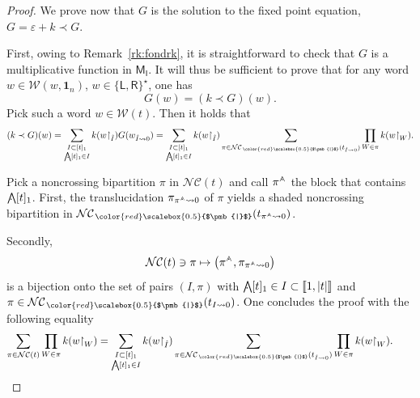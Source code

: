 \documentclass[pdftex]{sigma}
\renewcommand{\restriction}[2]{{#1\mathbin{\upharpoonright}_{#2}}}
\newcommand{\translucidation}[2]{{{#1}_{#2\leadsto0}}}
\newcommand{\bigwedgedot}{{\mathop{\bigwedge\hspace{-7.8pt}\raisebox{-1pt}[0pt][0pt]{$\cdot$}\hspace{3pt}}\nolimits}}
\newcommand{\bigwedgedots}{{\mathop{\bigwedge\hspace{-6.5pt}\raisebox{-1.5pt}[0pt][0pt]{$\cdot$}\hspace{2pt}}\nolimits}}
\newcommand{\wedgedot}{{\mathop{\wedge\hspace{-4.2pt}\raisebox{-1pt}[0pt][0pt]{$\cdot$}\hspace{2pt}}\nolimits}}
\newcommand{\wedgedots}{{\mathop{\wedge\hspace{-4pt}\raisebox{-1.5pt}[0pt][0pt]{$\cdot$}\hspace{1pt}}\nolimits}}
\newcommand\IWc{\mathcal{W}}
\newcommand{\BNCc}{\mathcal{N}\mathcal{C}}
\def\shBNCc{\BNCc_{\,{\color{red}\scalebox{0.5}{$\pmb{|}$}}}}
\newcommand\LL{{\mathsf{L}}}
\newcommand\RR{{\mathsf{R}}}
\newcommand\shgrI{{\mathsf M}_{\mathsf I}}
\numberwithin{equation}{section}
\begin{document}
\begin{proof}
We prove now that $G$ is the solution to the fixed point equation, $G = \varepsilon + k \prec G$.

First, owing to Remark~\ref{rk:fondrk}, it is straightforward to check that $G$ is a multiplicative function in $\shgrI$. It will thus be sufficient to prove that for any word $w\in \IWc(w,\mathbf{1}_n)$, $w\in \{\LL,\RR\}^{\star}$, one has
	\begin{equation*}
		G(w) = (k\prec G)(w).
	\end{equation*}
	Pick such a word $w \in \IWc(t)$. Then it holds that
	\begin{equation*}
 (k\prec G)(w) = \sum_{\substack{I \subset [t]_1 \\ \bigwedgedots [t]_1 \in I}} k(\restriction{w}{\hat{I}})G(\translucidation{w}{\hat{I}}) = \sum_{\substack{I \subset [t]_1 \\ \bigwedgedots [t]_1 \in I}} k(\restriction{w}{\hat{I}}) \sum_{\pi \in \shBNCc(\translucidation{t}{\hat{I}})} \prod_{W\in \pi} k(\restriction{w}{W}).
	\end{equation*}

Pick a noncrossing bipartition $\pi$ in $\BNCc(t)$ and call $\pi^{\wedgedot}$ the block that contains $\bigwedgedot[t]_1$. First, the translucidation $\translucidation{\pi}{\pi^{\wedgedots}}$ of $\pi$ yields a shaded noncrossing bipartition in
	${\shBNCc}(\translucidation{t}{\pi^{\wedgedots}})$.

Secondly,
	\[
		\BNCc(t)\ni \pi \mapsto \big(\pi^{\wedgedot}, \translucidation{\pi}{\pi^{\wedgedots}}\big)
	\]
	is a bijection onto the set of pairs $(I, \pi)$ with $\bigwedgedot[t]_1\in I\subset \llbracket 1,|t|\rrbracket$ and $\pi\in {\shBNCc}(\translucidation{t}{I})$. One concludes the proof with the following equality
	\begin{equation*}
 \sum_{\pi \in \BNCc(t)}\prod_{W\in \pi} k(\restriction{w}{W})= \sum_{\substack{I \subset [t]_1 \\ \bigwedgedots [t]_1 \in I}} k(\restriction{w}{\hat{I}}) \sum_{\pi \in {\shBNCc}(\translucidation{t}{\hat{I}})} \prod_{W\in \pi} k(\restriction{w}{W}).\tag*{\qed}
	\end{equation*}\renewcommand{\qed}{}
\end{proof}
\end{document}
